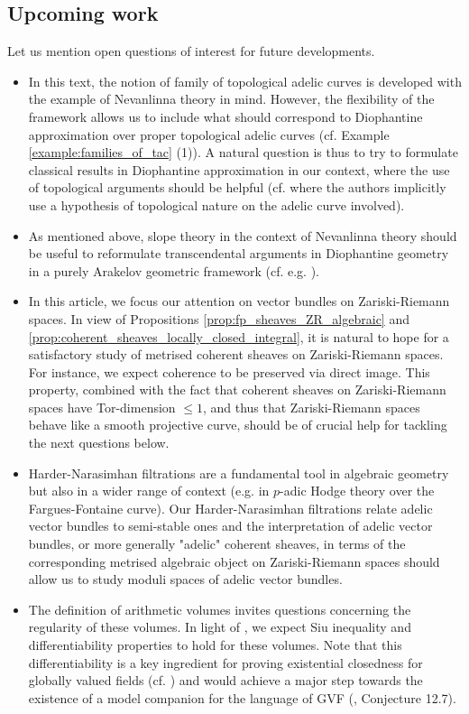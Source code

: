 \documentclass [11pt,reqno]{amsart}
\newcommand{\1}{\mathmybb{1}}
\begin{document}
\subsection*{Upcoming work}

Let us mention open questions of interest for future developments.

\begin{itemize}
	\item In this text, the notion of family of topological adelic curves is developed with the example of Nevanlinna theory in mind. However, the flexibility of the framework allows us to include what should correspond to Diophantine approximation over proper topological adelic curves (cf. Example \ref{example:families_of_tac} (1)). A natural question is thus to try to formulate classical results in Diophantine approximation in our context, where the use of topological arguments should be helpful (cf. \cite{Vojta21,DolceZucconi25} where the authors implicitly use a hypothesis of topological nature on the adelic curve involved).
	\item As mentioned above, slope theory in the context of Nevanlinna theory should be useful to reformulate transcendental arguments in Diophantine geometry in a purely Arakelov geometric framework (cf. e.g. \cite{Gasbarri25}). 
	\item In this article, we focus our attention on vector bundles on Zariski-Riemann spaces. In view of Propositions \ref{prop:fp_sheaves_ZR_algebraic} and \ref{prop:coherent_sheaves_locally_closed_integral}, it is natural to hope for a satisfactory study of metrised coherent sheaves on Zariski-Riemann spaces. For instance, we expect coherence to be preserved via direct image. This property, combined with the fact that coherent sheaves on Zariski-Riemann spaces have Tor-dimension $\leq 1$, and thus that Zariski-Riemann spaces behave like a smooth projective curve, should be of crucial help for tackling the next questions below.
	\item Harder-Narasimhan filtrations are a fundamental tool in algebraic geometry but also in a wider range of context (e.g. in $p$-adic Hodge theory over the Fargues-Fontaine curve). Our Harder-Narasimhan filtrations relate adelic vector bundles to semi-stable ones and the interpretation of adelic vector bundles, or more generally "adelic" coherent sheaves, in terms of the corresponding metrised algebraic object on Zariski-Riemann spaces should allow us to study moduli spaces of adelic vector bundles.
	\item The definition of arithmetic volumes invites questions concerning the regularity of these volumes. In light of \cite{Sedillot23_differentiability}, we expect Siu inequality and differentiability properties to hold for these volumes. Note that this differentiability is a key ingredient for proving existential closedness for globally valued fields (cf. \cite{Michal23}) and would achieve a major step towards the existence of a model companion for the language of GVF (\cite{GVF24}, Conjecture 12.7). 

\end{itemize}
\end{document}
